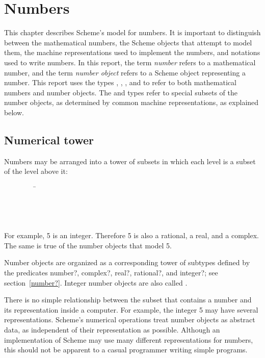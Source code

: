 \chapter{Numbers}
\label{numbertypeschapter}

This chapter describes Scheme's model for numbers.  It is important to
distinguish between the mathematical numbers, the Scheme objects that
attempt to model them, the machine representations used to implement
the numbers, and notations used to write numbers.  In this report, the
term \textit{number} refers to a mathematical number, and the term
\textit{number object} refers to a Scheme object representing a
number.  This report uses the types , ,
, and  to refer to both mathematical
numbers and number objects.  The  and  types
refer to special subsets of the number objects, as determined by
common machine representations, as explained below.

\section{Numerical tower}
\label{numericaltypes}

Numbers may be arranged into a tower of subsets in which each level
is a subset of the level above it:
\begin{tabbing}
\ \ \ \ \ \ \ \ \ \= \\
\>  \\
\>  \\
\>  \\
\>  
\end{tabbing}

For example, 5 is an integer.  Therefore 5 is also a rational,
a real, and a complex.  The same is true of the number objects
that model 5.  

Number objects are organized as a corresponding tower of subtypes
defined by the predicates {\cf number?}, {\cf complex?}, {\cf real?},
{\cf rational?}, and {\cf integer?}; see section~\ref{number?}.
Integer number objects are also called .

There is no simple relationship between the subset that contains a
number and its representation inside a computer.  For example, the
integer 5 may have several representations.  Scheme's numerical
operations treat number objects as abstract data, as independent of
their representation as possible.  Although an implementation of
Scheme may use many different representations for numbers, this should
not be apparent to a casual programmer writing simple programs.

